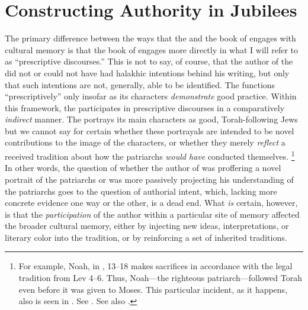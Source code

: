 
\section{Constructing Authority in Jubilees}
The primary difference between the ways that the \ga and the book of \jub engages with cultural memory is that the book of \jub engages more directly in what I will refer to as ``prescriptive discourses.'' This is not to say, of course, that the author of the \ga did not or could not have had halakhic intentions behind his writing, but only that such intentions are not, generally, able to be identified. The \ga functions ``prescriptively'' only insofar as its characters \emph{demonstrate} good practice. Within this framework, the \ga participates in prescriptive discourses in a comparatively \emph{indirect} manner. The \ga portrays its main characters as good, Torah-following Jews but we cannot say for certain whether these portrayals are intended to be novel contributions to the image of the characters, or whether they merely \emph{reflect} a received tradition about how the patriarchs \emph{would have} conducted themselves.%
    \footnote{For example, Noah, in , 13--18 makes sacrifices in accordance with the legal tradition from Lev 4--6. Thus, Noah---the righteous patriarch---followed Torah even before it was given to Moses. This particular incident, as it happens, also is seen in \jub. See \cite[112]{crawford2008}. See also \cite[419]{reeves_revq1986}.}
In other words, the question of whether the author of \ga was proffering a novel portrait of the patriarchs or was more passively projecting his understanding of the patriarchs goes to the question of authorial intent, which, lacking more concrete evidence one way or the other, is a dead end. What \emph{is} certain, however, is that the \emph{participation} of the author within a particular site of memory affected the broader cultural memory, either by injecting new ideas, interpretations, or literary color into the tradition, or by reinforcing a set of inherited traditions.

